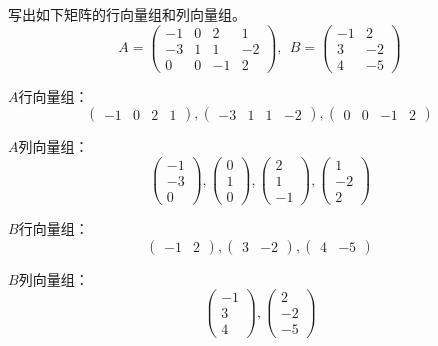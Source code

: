 \documentclass[a4paper]{report}
\begin{document}
\EX 写出如下矩阵的行向量组和列向量组。
\begin{equation*}
A=
\begin{pmatrix}
-1 &0&2&1\\ -3& 1&1&-2\\ 0&0&-1&2
\end{pmatrix},~~B=
\begin{pmatrix}
-1&2\\ 3&-2\\ 4&-5
\end{pmatrix}
\end{equation*}

\begin{jie}
$A$行向量组：
\begin{equation*}
\begin{pmatrix}
-1&0&2&1
\end{pmatrix},
\begin{pmatrix}
-3& 1&1&-2
\end{pmatrix},
\begin{pmatrix}
0&0&-1&2
\end{pmatrix}
\end{equation*}

$A$列向量组：
\begin{equation*}
\begin{pmatrix}
-1\\ -3\\ 0
\end{pmatrix},
\begin{pmatrix}
0\\ 1\\ 0
\end{pmatrix},
\begin{pmatrix}
2\\ 1\\ -1
\end{pmatrix},
\begin{pmatrix}
1\\ -2\\ 2
\end{pmatrix}
\end{equation*}

$B$行向量组：
\begin{equation*}
\begin{pmatrix}
-1&2
\end{pmatrix},
\begin{pmatrix}
3&-2
\end{pmatrix},
\begin{pmatrix}
4&-5
\end{pmatrix}
\end{equation*}

$B$列向量组：
\begin{equation*}
\begin{pmatrix}
-1\\ 3\\ 4
\end{pmatrix},
\begin{pmatrix}
2\\ -2\\ -5
\end{pmatrix}
\end{equation*}
\end{jie}
\end{document}
